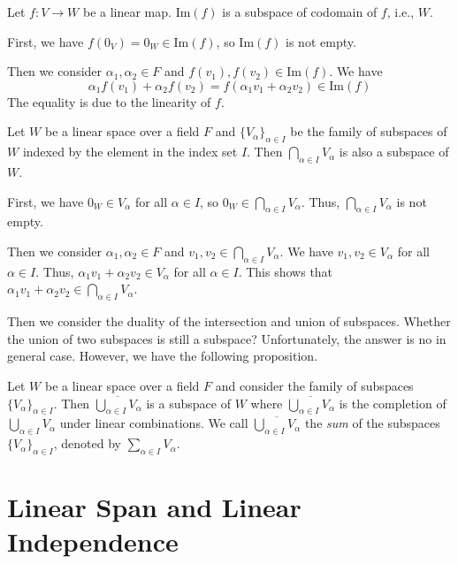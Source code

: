 \documentclass[
	11pt, %
	fleqn, %
	a4paper, %
]{LegrandOrangeBook}
\renewcommand{\Im}[1]{\text{Im}(#1)} %
\renewcommand{\bar}[1]{\overline{#1}} %
\begin{document}
\begin{example}
    Let $f : V \to W$ be a linear map. $\Im f$ is a subspace of codomain of $f$, i.e., $W$.

    First, we have $f(0_V) = 0_W \in \Im f$, so $\Im f$ is not empty.

    Then we consider $\alpha_1, \alpha_2 \in F$ and $f(v_1), f(v_2) \in \Im f$. We have 
    \[
        \alpha_1 f(v_1) + \alpha_2 f(v_2) = f(\alpha_1 v_1 + \alpha_2 v_2) \in \Im f
    \]
    The equality is due to the linearity of $f$.
\end{example}

\begin{example}
    Let $W$ be a linear space over a field $F$ and $\{V_\alpha\}_{\alpha \in I}$ be the family of subspaces of $W$ indexed by the element in the index set $I$. Then $\bigcap_{\alpha \in I} V_\alpha$ is also a subspace of $W$.

    First, we have $0_W \in V_\alpha$ for all $\alpha \in I$, so $0_W \in \bigcap_{\alpha \in I} V_\alpha$. Thus, $\bigcap_{\alpha \in I} V_\alpha$ is not empty.

    Then we consider $\alpha_1, \alpha_2 \in F$ and $v_1, v_2 \in \bigcap_{\alpha \in I} V_\alpha$. We have $v_1, v_2 \in V_\alpha$ for all $\alpha \in I$. Thus, $\alpha_1 v_1 + \alpha_2 v_2 \in V_\alpha$ for all $\alpha \in I$. This shows that $\alpha_1 v_1 + \alpha_2 v_2 \in \bigcap_{\alpha \in I} V_\alpha$.
\end{example}

Then we consider the duality of the intersection and union of subspaces. Whether the union of two subspaces is still a subspace? Unfortunately, the answer is no in general case. However, we have the following proposition.

\begin{proposition}
    Let $W$ be a linear space over a field $F$ and consider the family of subspaces $\{V_\alpha\}_{\alpha \in I}$. Then $\bar{\bigcup_{\alpha \in I} V_\alpha}$ is a subspace of $W$ where $\bar{\bigcup_{\alpha \in I} V_\alpha}$ is the completion of $\bigcup_{\alpha \in I} V_\alpha$ under linear combinations. We call $\bar{\bigcup_{\alpha \in I} V_\alpha}$ the \emph{sum} of the subspaces $\{V_\alpha\}_{\alpha \in I}$, denoted by $\sum_{\alpha \in I} V_\alpha$.
\end{proposition}

\newpage

\section{Linear Span and Linear Independence}
\end{document}
